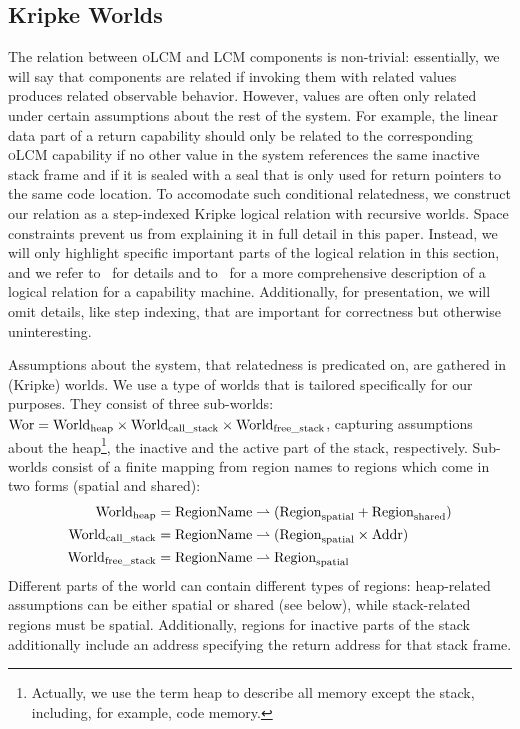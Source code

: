 \documentclass[acmsmall,review,showframe]{acmart}\settopmatter{printfolios=true,printccs=false,printacmref=false}
\renewcommand{\Worlds}{\World_{\mathrm{call\_stack}}}
\renewcommand{\Worldfs}{\World_{\mathrm{free\_stack}}}
\newcommand{\trgcm}{\textsc{LCM}}
\newcommand{\srccm}{\textsc{oLCM}}
\begin{document}
\subsection{Kripke Worlds}
\label{subsec:worlds}
The relation between \srccm{} and \trgcm{} components is non-trivial: essentially, we will say that components are related if invoking them with related values produces related observable behavior.
However, values are often only related under certain assumptions about the rest of the system.
For example, the linear data part of a return capability should only be related to the corresponding \srccm{} capability if no other value in the system references the same inactive stack frame and if it is sealed with a seal that is only used for return pointers to the same code location.
To accomodate such conditional relatedness, we construct our relation as a step-indexed Kripke logical relation with recursive worlds.
Space constraints prevent us from explaining it in full detail in this paper. 
Instead, we will only highlight specific important parts of the logical relation in this section, and we refer to~\citet{technical_report} for details and to~\citet{skorstengaard_reasoning_2017} for a more comprehensive description of a logical relation for a capability machine.
Additionally, for presentation, we will omit details, like step indexing, that are important for correctness but otherwise uninteresting.

Assumptions about the system, that relatedness is predicated on, are gathered in (Kripke) worlds. 
We use a type of worlds that is tailored specifically for our purposes.
They consist of three sub-worlds: $\Wor = \Worldh \times \Worlds \times \Worldfs$, capturing assumptions about the heap\footnote{Actually, we use the term heap to describe all memory except the stack, including, for example, code memory.}, the inactive and the active part of the stack, respectively.
Sub-worlds consist of a finite mapping from region names to regions which come in two forms (spatial and shared):
\begin{align*}
  \Worldh  &={} \RegionName \parfun (\Regions + \Regionh)\\
  \Worlds  &={} \RegionName \parfun (\Regions \times \Addr)\\
  \Worldfs &={} \RegionName \parfun \Regions
\end{align*}
Different parts of the world can contain different types of regions: heap-related assumptions can be either spatial or shared (see below), while stack-related regions must be spatial.
Additionally, regions for inactive parts of the stack additionally include an address specifying the return address for that stack frame.
\end{document}
